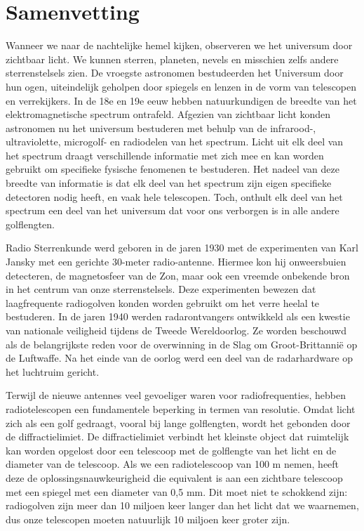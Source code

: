 \cleardoublepage                                                                                                                                                                                                                               
 

\chapter*{Samenvetting}\label{ch:summary_nl}

Wanneer we naar de nachtelijke hemel kijken, observeren we het universum door zichtbaar licht. We kunnen sterren, planeten, nevels en misschien zelfs andere sterrenstelsels zien. De vroegste astronomen bestudeerden het Universum door hun ogen, uiteindelijk geholpen door spiegels en lenzen in de vorm van telescopen en verrekijkers. In de 18e en 19e eeuw hebben natuurkundigen de breedte van het elektromagnetische spectrum ontrafeld. Afgezien van zichtbaar licht konden astronomen nu het universum bestuderen met behulp van de infrarood-, ultraviolette, microgolf- en radiodelen van het spectrum. Licht uit elk deel van het spectrum draagt verschillende informatie met zich mee en kan worden gebruikt om specifieke fysische fenomenen te bestuderen. Het nadeel van deze breedte van informatie is dat elk deel van het spectrum zijn eigen specifieke detectoren nodig heeft, en vaak hele telescopen. Toch, onthult elk deel van het spectrum een deel van het universum dat voor ons verborgen is in alle andere golflengten.

Radio Sterrenkunde werd geboren in de jaren 1930 met de experimenten van Karl Jansky met een gerichte 30-meter radio-antenne. Hiermee kon hij onweersbuien detecteren, de magnetosfeer van de Zon, maar ook een vreemde onbekende bron in het centrum van onze sterrenstelsels. Deze experimenten bewezen dat laagfrequente radiogolven konden worden gebruikt om het verre heelal te bestuderen. In de jaren 1940 werden radarontvangers ontwikkeld als een kwestie van nationale veiligheid tijdens de Tweede Wereldoorlog. Ze worden beschouwd als de belangrijkste reden voor de overwinning in de Slag om Groot-Brittannië op de Luftwaffe. Na het einde van de oorlog werd een deel van de radarhardware op het luchtruim gericht.

Terwijl de nieuwe antennes veel gevoeliger waren voor radiofrequenties, hebben radiotelescopen een fundamentele beperking in termen van resolutie. Omdat licht zich als een golf gedraagt, vooral bij lange golflengten, wordt het gebonden door de diffractielimiet. De diffractielimiet verbindt het kleinste object dat ruimtelijk kan worden opgelost door een telescoop met de golflengte van het licht en de diameter van de telescoop. Als we een radiotelescoop van 100 m nemen, heeft deze de oplossingsnauwkeurigheid die equivalent is aan een zichtbare telescoop met een spiegel met een diameter van 0,5 mm. Dit moet niet te schokkend zijn: radiogolven zijn meer dan 10 miljoen keer langer dan het licht dat we waarnemen, dus onze telescopen moeten natuurlijk 10 miljoen keer groter zijn.

